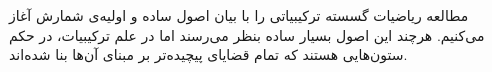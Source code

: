مطالعه ریاضیات گسسته ترکیبیاتی را با بیان اصول ساده و اولیه‌ی شمارش آغاز می‌کنیم.
هرچند این اصول بسیار ساده بنظر می‌رسند اما در علم ترکیبیات، در حکم ستون‌هایی هستند
که تمام قضایای پیچیده‌تر بر مبنای آن‌ها بنا شده‌اند.








